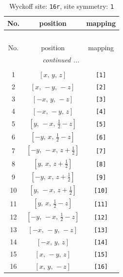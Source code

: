 \documentclass[fleqn,8pt]{jsarticle}
\begin{document}
\begin{longtable}{ccc}
\caption{Wyckoff site: {\tt 16r}, site symmetry: {\tt 1}}
 \\
 \hline \hline
No. & position & mapping \\ \hline \endfirsthead

\multicolumn{2}{l}{\tablename\ \thetable{}} \\
 \hline \hline
No. & position & mapping \\ \hline \endhead

 \hline \hline
\multicolumn{2}{r}{\footnotesize\it continued ...} \\ \endfoot

 \hline \hline
\multicolumn{2}{r}{} \\ \endlastfoot

1 & $\left[ x,\, y,\, z \right]$ & {\tt [1]} \\ \hline
2 & $\left[ x,\, - y,\, - z \right]$ & {\tt [2]} \\ \hline
3 & $\left[ - x,\, y,\, - z \right]$ & {\tt [3]} \\ \hline
4 & $\left[ - x,\, - y,\, z \right]$ & {\tt [4]} \\ \hline
5 & $\left[ y,\, - x,\, \frac{1}{2} - z \right]$ & {\tt [5]} \\ \hline
6 & $\left[ - y,\, x,\, \frac{1}{2} - z \right]$ & {\tt [6]} \\ \hline
7 & $\left[ - y,\, - x,\, z + \frac{1}{2} \right]$ & {\tt [7]} \\ \hline
8 & $\left[ y,\, x,\, z + \frac{1}{2} \right]$ & {\tt [8]} \\ \hline
9 & $\left[ - y,\, x,\, z + \frac{1}{2} \right]$ & {\tt [9]} \\ \hline
10 & $\left[ y,\, - x,\, z + \frac{1}{2} \right]$ & {\tt [10]} \\ \hline
11 & $\left[ y,\, x,\, \frac{1}{2} - z \right]$ & {\tt [11]} \\ \hline
12 & $\left[ - y,\, - x,\, \frac{1}{2} - z \right]$ & {\tt [12]} \\ \hline
13 & $\left[ - x,\, - y,\, - z \right]$ & {\tt [13]} \\ \hline
14 & $\left[ - x,\, y,\, z \right]$ & {\tt [14]} \\ \hline
15 & $\left[ x,\, - y,\, z \right]$ & {\tt [15]} \\ \hline
16 & $\left[ x,\, y,\, - z \right]$ & {\tt [16]} \\
\end{longtable}
\end{document}
